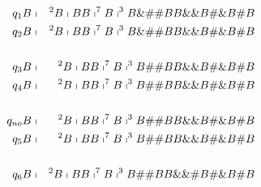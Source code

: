 \begin{frame}
  \begin{eqnarray*}
    q_{1}B &\shortmid &^{2}B\shortmid BB\shortmid ^{7}B\shortmid 
    ^{3}B\&\#\#BB\&\&B\#\&B\#B \\
    q_{2}B &\shortmid &^{2}B\shortmid BB\shortmid ^{7}B\shortmid
    ^{3}B\&\#\#BB\&\&B\#\&B\#B \\
    && \\
    q_{3}B &\shortmid &^{2}B\shortmid BB\shortmid ^{7}B\shortmid
    ^{3}B\#\#BB\&\&B\#\&B\#B \\
    q_{4}B &\shortmid &^{2}B\shortmid BB\shortmid ^{7}B\shortmid
    ^{3}B\#\#BB\&\&B\#\&B\#B \\
    && \\
    q_{no}B &\shortmid &^{2}B\shortmid BB\shortmid ^{7}B\shortmid
    ^{3}B\#\#BB\&\&B\#\&B\#B \\
    q_{5}B &\shortmid &^{2}B\shortmid BB\shortmid ^{7}B\shortmid
    ^{3}B\#\#BB\&\&B\#\&B\#B \\
    && \\
    q_{6}B &\shortmid &^{2}B\shortmid BB\shortmid ^{7}B\shortmid
    ^{3}B\#\#BB\&\&\#B\#\&B\#B
  \end{eqnarray*}
\end{frame}
